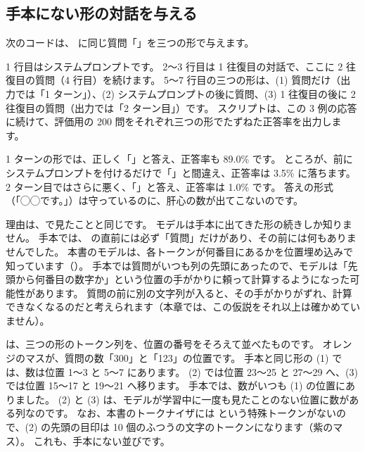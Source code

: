 \subsection{手本にない形の対話を与える}

次のコードは、 に同じ質問「」を三つの形で与えます。


1 行目はシステムプロンプトです。
2〜3 行目は 1 往復目の対話で、ここに 2 往復目の質問（4 行目）を続けます。
5〜7 行目の三つの形は、(1) 質問だけ（出力では「1 ターン」）、(2) システムプロンプトの後に質問、(3) 1 往復目の後に 2 往復目の質問（出力では「2 ターン目」）です。
スクリプトは、この 3 例の応答に続けて、評価用の 200 問をそれぞれ三つの形でたずねた正答率を出力します。


1 ターンの形では、正しく「」と答え、正答率も 89.0\% です。
ところが、前にシステムプロンプトを付けるだけで「」と間違え、正答率は 3.5\% に落ちます。
2 ターン目ではさらに悪く、「」と答え、正答率は 1.0\% です。
答えの形式（「◯◯です。」）は守っているのに、肝心の数が出てこないのです。

理由は、で見たことと同じです。
モデルは手本に出てきた形の続きしか知りません。
手本では、 の直前には必ず「質問」だけがあり、その前には何もありませんでした。
本書のモデルは、各トークンが何番目にあるかを位置埋め込みで知っています（）。
手本では質問がいつも列の先頭にあったので、モデルは「先頭から何番目の数字か」という位置の手がかりに頼って計算するようになった可能性があります。
質問の前に別の文字列が入ると、その手がかりがずれ、計算できなくなるのだと考えられます（本章では、この仮説をそれ以上は確かめていません）。

は、三つの形のトークン列を、位置の番号をそろえて並べたものです。
オレンジのマスが、質問の数「300」と「123」の位置です。
手本と同じ形の (1) では、数は位置 1〜3 と 5〜7 にあります。
(2) では位置 23〜25 と 27〜29 へ、(3) では位置 15〜17 と 19〜21 へ移ります。
手本では、数がいつも (1) の位置にありました。
(2) と (3) は、モデルが学習中に一度も見たことのない位置に数がある列なのです。
なお、本書のトークナイザには  という特殊トークンがないので、(2) の先頭の目印は 10 個のふつうの文字のトークンになります（紫のマス）。
これも、手本にない並びです。

